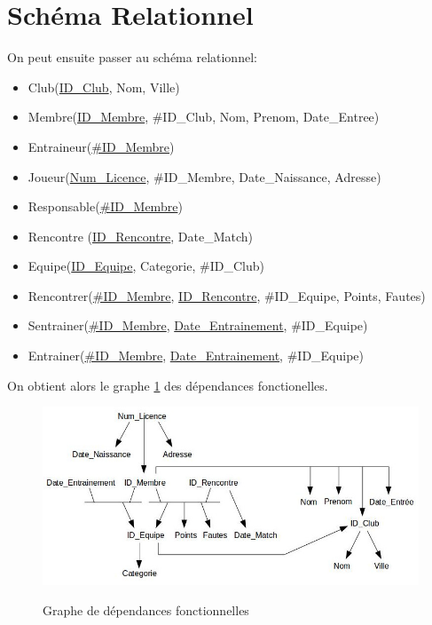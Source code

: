 \documentclass[a4paper»,8pt,french,fleqn]{report}
\begin{document}
\section{Schéma Relationnel}

On peut ensuite passer au schéma relationnel: \\

\begin{itemize}

\item Club(\underline{ID\_Club}, Nom, Ville)  
\item Membre(\underline{ID\_Membre}, \#ID\_Club, Nom, Prenom, Date\_Entree) 
\item Entraineur(\underline{\#ID\_Membre}) 
\item Joueur(\underline{Num\_Licence}, \#ID\_Membre, Date\_Naissance, Adresse) 
\item Responsable(\underline{\#ID\_Membre}) 
\item Rencontre (\underline{ID\_Rencontre}, Date\_Match) 
\item Equipe(\underline{ID\_Equipe}, Categorie, \#ID\_Club) 
\item Rencontrer(\underline{\#ID\_Membre}, \underline{ID\_Rencontre}, \#ID\_Equipe, Points, Fautes) 
\item Sentrainer(\underline{\#ID\_Membre}, \underline{Date\_Entrainement}, \#ID\_Equipe) 
\item Entrainer(\underline{\#ID\_Membre}, \underline{Date\_Entrainement}, \#ID\_Equipe) \\

\end{itemize}

On obtient alors le graphe \ref{fig:depfct} des dépendances fonctionelles.

\begin{figure}[h]
  \centering
    \includegraphics[scale=0.5]{DepFct.jpeg}
    \label{fig:depfct}
    \caption{Graphe de dépendances fonctionnelles}
\end{figure}
\end{document}
